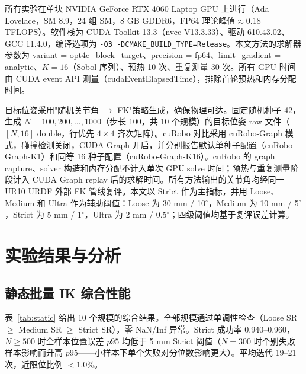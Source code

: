 \documentclass[twocolumn,a4paper,10pt]{ctexart}
\begin{document}
所有实验在单块 NVIDIA GeForce RTX 4060 Laptop GPU 上进行（Ada Lovelace，SM 8.9，24 组 SM，8 GB GDDR6，FP64 理论峰值$\approx$0.18 TFLOPS）。软件栈为 CUDA Toolkit 13.3（nvcc V13.3.33）、驱动 610.43.02、GCC 11.4.0，编译选项为 \texttt{-O3 -DCMAKE\_BUILD\_TYPE=Release}。本文方法的求解器参数为 variant = opt4c\_block\_target、precision = fp64、limit\_gradient = analytic、$K=16$（Sobol 序列\cite{sobol1967}）、预热 10 次、重复测量 30 次。所有 GPU 时间由 CUDA event API 测量（cudaEventElapsedTime），排除首轮预热和内存分配时间。

目标位姿采用"随机关节角 $\to$ FK"策略生成，确保物理可达。固定随机种子 42，生成 $N=100,200,\dots,1000$（步长 100，共 10 个规模）的目标位姿 raw 文件（$[N,16]$ double，行优先 $4\times4$ 齐次矩阵）。cuRobo 对比采用 cuRobo-Graph 模式，碰撞检测关闭，CUDA Graph 开启，并分别报告默认单种子配置（cuRobo-Graph-K1）和同等 16 种子配置（cuRobo-Graph-K16）。cuRobo 的 graph capture、solver 构造和内存分配不计入单次 GPU solve 时间；预热与重复测量阶段计入 CUDA Graph replay 后的求解时间。所有方法输出的关节角均经同一 UR10 URDF 外部 FK 管线复评。本文以 Strict 作为主指标，并用 Loose、Medium 和 Ultra 作为辅助阈值：Loose 为 30 mm / 10$^\circ$，Medium 为 10 mm / 5$^\circ$，Strict 为 5 mm / 1$^\circ$，Ultra 为 2 mm / 0.5$^\circ$；四级阈值均基于复评误差计算。

\section{实验结果与分析}

\subsection{静态批量 IK 综合性能}

表~\ref{tab:static} 给出 10 个规模的综合结果。全部规模通过单调性检查（Loose SR $\ge$ Medium SR $\ge$ Strict SR），零 NaN/Inf 异常。Strict 成功率 0.940--0.960，$N\ge500$ 时全样本位置误差 $p95$ 均低于 5 mm Strict 阈值（$N=300$ 时个别失败样本影响而升高 $p95$——小样本下单个失败对分位数影响更大）。平均迭代 19--21 次，近限位比例 $<1.0\%$。
\end{document}
